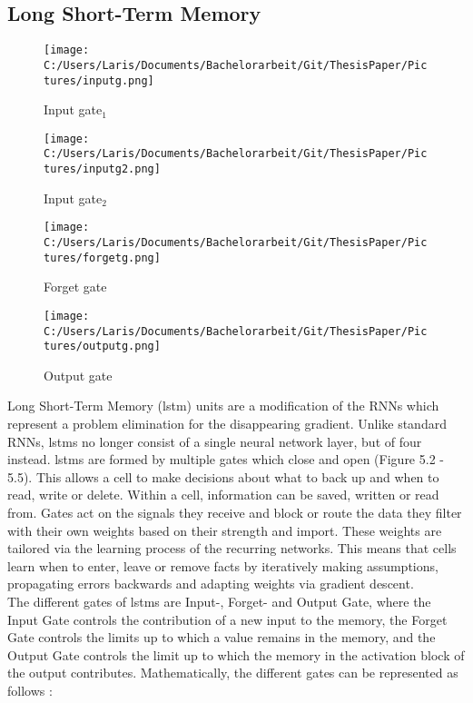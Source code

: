 \documentclass[a4paper, 11pt,titlepage,oneside,openany]{book}
\begin{document}
\subsection{Long Short-Term Memory}
\begin{figure}[h]
	\begin{minipage}[b]{0.4\textwidth}
		\texttt{[image: C:/Users/Laris/Documents/Bachelorarbeit/Git/ThesisPaper/Pictures/inputg.png]}
		\caption{Input gate$_1$ \cite{rnn}}
	\end{minipage}
	\hfill
	\begin{minipage}[b]{0.4\textwidth}
		\texttt{[image: C:/Users/Laris/Documents/Bachelorarbeit/Git/ThesisPaper/Pictures/inputg2.png]}
		\caption{Input gate$_2$ \cite{rnn}}
	\end{minipage}
	\begin{minipage}[b]{0.4\textwidth}
		\texttt{[image: C:/Users/Laris/Documents/Bachelorarbeit/Git/ThesisPaper/Pictures/forgetg.png]}
		\caption{Forget gate \cite{rnn}}
	\end{minipage}
	\hfill
	\begin{minipage}[b]{0.4\textwidth}
		\texttt{[image: C:/Users/Laris/Documents/Bachelorarbeit/Git/ThesisPaper/Pictures/outputg.png]}
		\caption{Output gate \cite{rnn}}
	\end{minipage}
\end{figure}
\noindent Long Short-Term Memory (\gls{lstm}) units \cite{lstm} are a modification of the RNNs which represent a problem elimination for the disappearing gradient. Unlike standard RNNs, \gls{lstm}s no longer consist of a single neural network layer, but of four instead. \gls{lstm}s are formed by multiple gates which close and open (Figure 5.2 - 5.5). This allows a cell to make decisions about what to back up and when to read, write or delete. Within a cell, information can be saved, written or read from. Gates act on the signals they receive and block or route the data they filter with their own weights based on their strength and import. These weights are tailored via the learning process of the recurring networks. This means that cells learn when to enter, leave or remove facts by iteratively making assumptions, propagating errors backwards and adapting weights via gradient descent.\\
The different gates of \gls{lstm}s are Input-, Forget- and Output Gate, where the Input Gate controls the contribution of a new input to the memory, the Forget Gate controls the limits up to which a value remains in the memory, and the Output Gate controls the limit up to which the memory in the activation block of the output contributes. Mathematically, the different gates can be represented as follows \cite{rnn}: 
\end{document}
